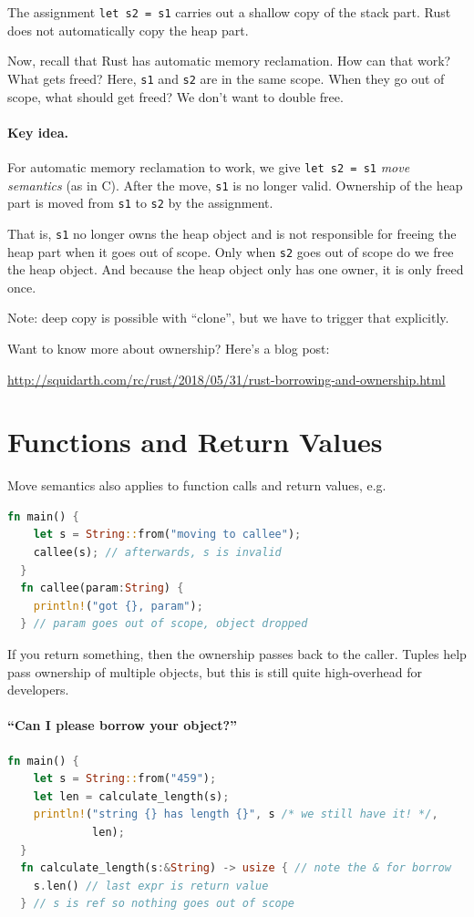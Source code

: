 \documentclass[a4paper]{report}
\newcommand{\CPP}{C\nolinebreak\hspace{-.05em}\raisebox{.4ex}{\tiny\bf +}\nolinebreak\hspace{-.10em}\raisebox{.4ex}{\tiny\bf +}}
\def\CPP{{C\nolinebreak[4]\hspace{-.05em}\raisebox{.4ex}{\tiny\bf ++}}}
\begin{document}
The assignment {\tt let s2 = s1} carries out a shallow copy of the stack part. Rust
does not automatically copy the heap part.

Now, recall that Rust has automatic memory reclamation. How can that
work? What gets freed?  Here, {\tt s1} and {\tt s2} are in the same
scope. When they go out of scope, what should get freed? We
don't want to double free.

\paragraph{Key idea.} For automatic memory reclamation to work, we give {\tt let s2 = s1} \emph{move semantics}
(as in \CPP). After the move, {\tt s1} is no longer valid.
Ownership of the heap part is moved from {\tt s1} to {\tt s2} by the assignment.

That is, {\tt s1} no longer owns the heap object and is not responsible for freeing the heap part
when it goes out of scope. Only when {\tt s2} goes out of scope do we free the heap object.
And because the heap object only has one owner, it is only freed once.

Note: deep copy is possible with ``clone'', but we have to trigger that explicitly.

Want to know more about ownership? Here's a blog post:
\begin{center}
  \url{http://squidarth.com/rc/rust/2018/05/31/rust-borrowing-and-ownership.html}
\end{center}
\section*{Functions and Return Values}

Move semantics also applies to function calls and return values, e.g.
\begin{lstlisting}[language=Rust]
  fn main() {
    let s = String::from("moving to callee");
    callee(s); // afterwards, s is invalid
  }
  fn callee(param:String) {
    println!("got {}, param");
  } // param goes out of scope, object dropped
\end{lstlisting}
If you return something, then the ownership passes back to the caller.
Tuples help pass ownership of multiple objects, but this is still quite
high-overhead for developers.

\paragraph{``Can I please borrow your object?''}
\begin{lstlisting}[language=Rust]
  fn main() {
    let s = String::from("459");
    let len = calculate_length(s);
    println!("string {} has length {}", s /* we still have it! */,
             len);
  }
  fn calculate_length(s:&String) -> usize { // note the & for borrow
    s.len() // last expr is return value
  } // s is ref so nothing goes out of scope
\end{lstlisting}
  
\end{document}
